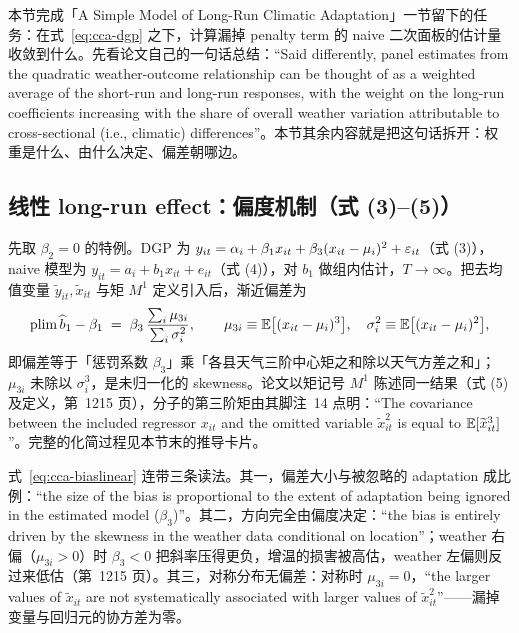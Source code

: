 
本节完成「A Simple Model of Long-Run Climatic Adaptation」一节留下的任务：在式~\ref{eq:cca-dgp} 之下，计算漏掉 penalty term 的 naive 二次面板的估计量收敛到什么。先看论文自己的一句话总结：``Said differently, panel estimates from the quadratic weather-outcome relationship can be thought of as a weighted average of the short-run and long-run responses, with the weight on the long-run coefficients increasing with the share of overall weather variation attributable to cross-sectional (i.e., climatic) differences''\citep[第~1209 页]{merel2021climate}。本节其余内容就是把这句话拆开：权重是什么、由什么决定、偏差朝哪边。

\subsection{线性 long-run effect：偏度机制（式 (3)--(5)）}

先取 $\beta_2=0$ 的特例。DGP 为 $y_{it} = \alpha_i + \beta_1 x_{it} + \beta_3 (x_{it}-\mu_i)^2 + \varepsilon_{it}$（式 (3)），naive 模型为 $y_{it} = a_i + b_1 x_{it} + e_{it}$（式 (4)），对 $b_1$ 做组内估计，$T\to\infty$。把去均值变量 $\widetilde{y}_{it}, \widetilde{x}_{it}$ 与矩 $M^1$ 定义引入后，渐近偏差为
\begin{equation}
\mathrm{plim}\,\widehat{b}_1 - \beta_1 \;=\; \beta_3\,\frac{\sum_i \mu_{3i}}{\sum_i \sigma_i^2},
\qquad
\mu_{3i} \equiv \mathbb{E}\bigl[(x_{it}-\mu_i)^3\bigr],\quad
\sigma_i^2 \equiv \mathbb{E}\bigl[(x_{it}-\mu_i)^2\bigr],
\label{eq:cca-biaslinear}
\end{equation}
即偏差等于「惩罚系数 $\beta_3$」乘「各县天气三阶中心矩之和除以天气方差之和」；$\mu_{3i}$ 未除以 $\sigma_i^3$，是未归一化的 skewness。论文以矩记号 $M^1$ 陈述同一结果（式 (5) 及定义，第~1215 页），分子的第三阶矩由其脚注~14 点明：``The covariance between the included regressor $x_{it}$ and the omitted variable $\widetilde{x}_{it}^2$ is equal to $\mathbb{E}[\widetilde{x}_{it}^3]$''\citep[第~1215 页脚注~14]{merel2021climate}。完整的化简过程见本节末的推导卡片。

式~\ref{eq:cca-biaslinear} 连带三条读法。其一，偏差大小与被忽略的 adaptation 成比例：``the size of the bias is proportional to the extent of adaptation being ignored in the estimated model ($\beta_3$)''\citep[第~1215 页]{merel2021climate}。其二，方向完全由偏度决定：``the bias is entirely driven by the skewness in the weather data conditional on location''\citep[第~1215 页]{merel2021climate}；weather 右偏（$\mu_{3i}>0$）时 $\beta_3<0$ 把斜率压得更负，增温的损害被高估，weather 左偏则反过来低估（第~1215 页）。其三，对称分布无偏差：对称时 $\mu_{3i}=0$，``the larger values of $\widetilde{x}_{it}$ are not systematically associated with larger values of $\widetilde{x}_{it}^2$''\citep[第~1215 页]{merel2021climate}——漏掉变量与回归元的协方差为零。

